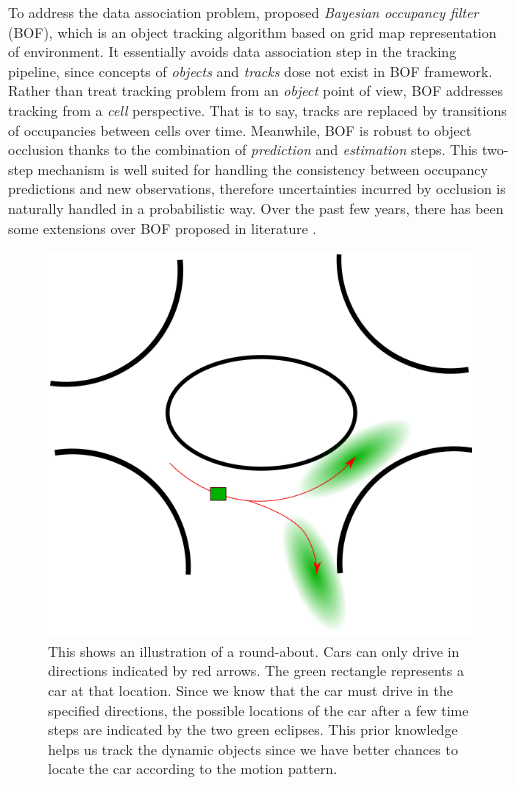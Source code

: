 To address the data association problem, \citet{coue2006bayesian} proposed \textit{Bayesian occupancy filter} (BOF), which is an object tracking algorithm based on grid map representation of environment. It essentially avoids data association step in the tracking pipeline, since concepts of \textit{objects} and \textit{tracks} dose not exist in BOF framework. Rather than treat tracking problem from an \textit{object} point of view, BOF addresses tracking from a \textit{cell} perspective. That is to say, tracks are replaced by transitions of occupancies between cells over time. Meanwhile, BOF is robust to object occlusion thanks to the combination of \textit{prediction} and \textit{estimation} steps. This two-step mechanism is well suited for handling the consistency between occupancy predictions and new observations, therefore uncertainties incurred by occlusion is naturally handled in a probabilistic way. Over the past few years, there has been some extensions over BOF proposed in literature \citep{gindele2009bayesian, brechtel2010recursive, llamazares2013dynamic}. 

\begin{figure}[H]
  \centering
    \includegraphics[width=.5\textwidth]{figures/roundabout.png}
    \caption[An illustration of a round-about]{This shows an illustration of a round-about. Cars can only drive in directions indicated by red arrows. The green rectangle represents a car at that location. Since we know that the car must drive in the specified directions, the possible locations of the car after a few time steps are indicated by the two green eclipses. This prior knowledge helps us track the dynamic objects since we have better chances to locate the car according to the motion pattern.}
    \label{fig:roundabout_idea}
\end{figure}

